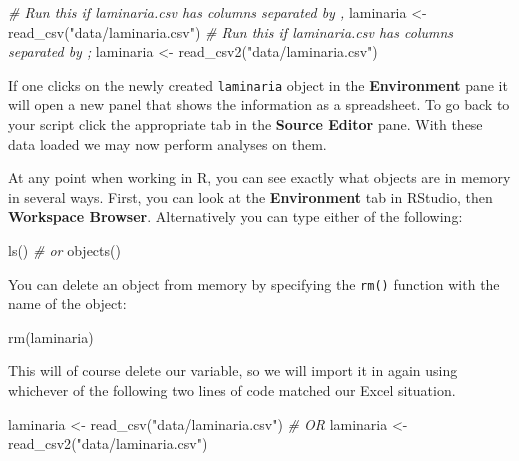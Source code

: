 \documentclass[
]{book}
\newenvironment{Shaded}{\begin{snugshade}}{\end{snugshade}}
\newcommand{\CommentTok}[1]{\textcolor[rgb]{0.56,0.35,0.01}{\textit{#1}}}
\newcommand{\FunctionTok}[1]{\textcolor[rgb]{0.00,0.00,0.00}{#1}}
\newcommand{\NormalTok}[1]{#1}
\newcommand{\OtherTok}[1]{\textcolor[rgb]{0.56,0.35,0.01}{#1}}
\newcommand{\StringTok}[1]{\textcolor[rgb]{0.31,0.60,0.02}{#1}}
\begin{document}
\begin{Shaded}
\begin{Highlighting}[]
\CommentTok{\# Run this if \textquotesingle{}laminaria.csv\textasciigrave{} has columns separated by \textquotesingle{},\textquotesingle{}}
\NormalTok{laminaria }\OtherTok{\textless{}{-}} \FunctionTok{read\_csv}\NormalTok{(}\StringTok{"data/laminaria.csv"}\NormalTok{)}
\CommentTok{\# Run this if \textquotesingle{}laminaria.csv\textasciigrave{} has columns separated by \textquotesingle{};\textquotesingle{}}
\NormalTok{laminaria }\OtherTok{\textless{}{-}} \FunctionTok{read\_csv2}\NormalTok{(}\StringTok{"data/laminaria.csv"}\NormalTok{)}
\end{Highlighting}
\end{Shaded}

If one clicks on the newly created \texttt{laminaria} object in the \textbf{Environment} pane it will open a new panel that shows the information as a spreadsheet. To go back to your script click the appropriate tab in the \textbf{Source Editor} pane. With these data loaded we may now perform analyses on them.

At any point when working in R, you can see exactly what objects are in memory in several ways. First, you can look at the \textbf{Environment} tab in RStudio, then \textbf{Workspace Browser}. Alternatively you can type either of the following:

\begin{Shaded}
\begin{Highlighting}[]
\FunctionTok{ls}\NormalTok{()}
\CommentTok{\# or}
\FunctionTok{objects}\NormalTok{()}
\end{Highlighting}
\end{Shaded}

You can delete an object from memory by specifying the \texttt{rm()} function with the name of the object:

\begin{Shaded}
\begin{Highlighting}[]
\FunctionTok{rm}\NormalTok{(laminaria)}
\end{Highlighting}
\end{Shaded}

This will of course delete our variable, so we will import it in again using whichever of the following two lines of code matched our Excel situation.

\begin{Shaded}
\begin{Highlighting}[]
\NormalTok{laminaria }\OtherTok{\textless{}{-}} \FunctionTok{read\_csv}\NormalTok{(}\StringTok{"data/laminaria.csv"}\NormalTok{)}
\CommentTok{\# OR}
\NormalTok{laminaria }\OtherTok{\textless{}{-}} \FunctionTok{read\_csv2}\NormalTok{(}\StringTok{"data/laminaria.csv"}\NormalTok{)}
\end{Highlighting}
\end{Shaded}
\end{document}
